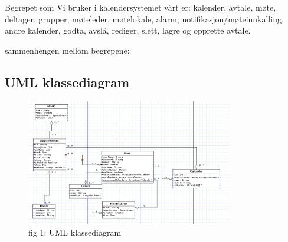 Begrepet som Vi bruker i kalendersystemet vårt er:
kalender, avtale, møte, deltager, grupper, møteleder, møtelokale, alarm, notifikasjon/møteinnkalling, andre kalender, godta, avslå, rediger, slett, lagre og opprette avtale.

sammenhengen mellom begrepene:


\subsection{UML klassediagram}
\begin{figure}[ht!]
\includegraphics[width=90mm]{UML.png}
\caption{fig 1: UML klassediagram}
\end{figure}